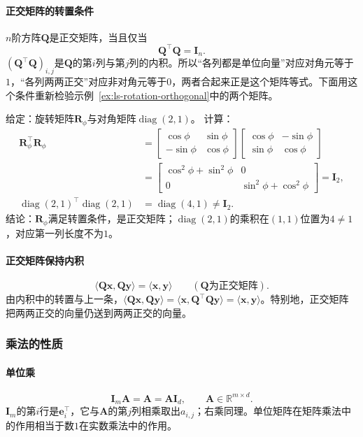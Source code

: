\paragraph{正交矩阵的转置条件}
$n$阶方阵$\bm Q$是正交矩阵，当且仅当
\[
 \bm Q^\top\bm Q=\bm I_n.
\]
$(\bm Q^\top\bm Q)_{i,j}$是$\bm Q$的第$i$列与第$j$列的内积。所以“各列都是单位向量”对应对角元等于$1$，“各列两两正交”对应非对角元等于$0$，两者合起来正是这个矩阵等式。下面用这个条件重新检验示例~\ref{ex:ls-rotation-orthogonal}中的两个矩阵。
\begin{example}[用转置条件检验正交矩阵]
\label{ex:ls-orthogonality-by-transpose}
给定：旋转矩阵$\bm R_\phi$与对角矩阵$\operatorname{diag}(2,1)$。
计算：
\[
 \begin{aligned}
 \bm R_\phi^\top\bm R_\phi
 &=\begin{bmatrix}\cos\phi&\sin\phi\\-\sin\phi&\cos\phi\end{bmatrix}
   \begin{bmatrix}\cos\phi&-\sin\phi\\\sin\phi&\cos\phi\end{bmatrix}\\
 &=\begin{bmatrix}\cos^2\phi+\sin^2\phi&0\\0&\sin^2\phi+\cos^2\phi\end{bmatrix}
 =\bm I_2,\\
 \operatorname{diag}(2,1)^\top\operatorname{diag}(2,1)&=\operatorname{diag}(4,1)\neq\bm I_2.
 \end{aligned}
\]
结论：$\bm R_\phi$满足转置条件，是正交矩阵；$\operatorname{diag}(2,1)$的乘积在$(1,1)$位置为$4\neq1$，对应第一列长度不为$1$。
\end{example}

\paragraph{正交矩阵保持内积}
\[
 \langle\bm Q\bm x,\bm Q\bm y\rangle=\langle\bm x,\bm y\rangle\qquad(\bm Q\text{为正交矩阵}).
\]
由内积中的转置与上一条，$\langle\bm Q\bm x,\bm Q\bm y\rangle=\langle\bm x,\bm Q^\top\bm Q\bm y\rangle=\langle\bm x,\bm y\rangle$。特别地，正交矩阵把两两正交的向量仍送到两两正交的向量。

\subsubsection{乘法的性质}

\paragraph{单位乘}
\[
 \bm I_m\bm A=\bm A=\bm A\bm I_d,\qquad\bm A\in\mathbb R^{m\times d}.
\]
$\bm I_m$的第$i$行是$\bm e_i^\top$，它与$\bm A$的第$j$列相乘取出$a_{i,j}$；右乘同理。单位矩阵在矩阵乘法中的作用相当于数$1$在实数乘法中的作用。

